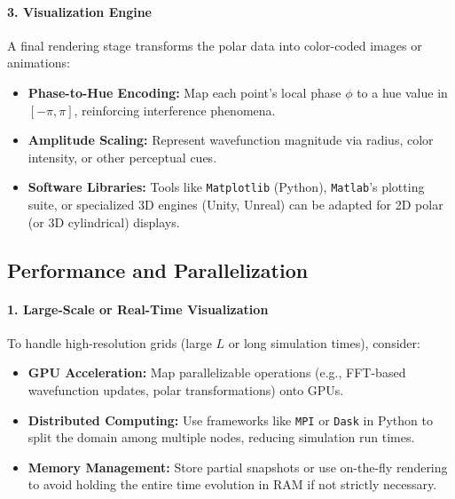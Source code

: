 \documentclass{article}
\begin{document}
\paragraph{3. Visualization Engine}
A final rendering stage transforms the polar data into color-coded images or animations:
\begin{itemize}
    \item \textbf{Phase-to-Hue Encoding:} Map each point’s local phase \(\phi\) to a hue value in \([- \pi, \pi]\), reinforcing interference phenomena.
    \item \textbf{Amplitude Scaling:} Represent wavefunction magnitude via radius, color intensity, or other perceptual cues.
    \item \textbf{Software Libraries:} Tools like \texttt{Matplotlib} (Python), \texttt{Matlab}’s plotting suite, or specialized 3D engines (Unity, Unreal) can be adapted for 2D polar (or 3D cylindrical) displays.
\end{itemize}


\subsection{Performance and Parallelization}

\paragraph{1. Large-Scale or Real-Time Visualization}
To handle high-resolution grids (large \(L\) or long simulation times), consider:
\begin{itemize}
    \item \textbf{GPU Acceleration:} Map parallelizable operations (e.g., FFT-based wavefunction updates, polar transformations) onto GPUs.
    \item \textbf{Distributed Computing:} Use frameworks like \texttt{MPI} or \texttt{Dask} in Python to split the domain among multiple nodes, reducing simulation run times.
    \item \textbf{Memory Management:} Store partial snapshots or use on-the-fly rendering to avoid holding the entire time evolution in RAM if not strictly necessary.
\end{itemize}
\end{document}
